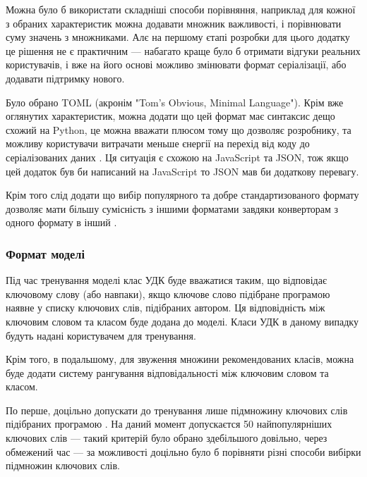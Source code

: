 \documentclass[14pt]{extarticle}
\begin{document}
  Можна було б використати складніші способи порівняння,
  наприклад для кожної з обраних характеристик можна додавати множник
  важливості, і порівнювати суму значень з множниками.
  Алє на першому єтапі розробки для цього додатку це рішення не є практичним ---
  набагато краще було б отримати відгуки реальних користувачів,
  і вже на його основі можливо змінювати формат серіалізації,
  або додавати підтримку нового.

  Було обрано TOML (акронім "Tom's Obvious, Minimal Language").
  Крім вже оглянутих характеристик,
  можна додати що цей формат має синтаксис дещо схожий на Python,
  це можна вважати плюсом тому що дозволяє розробнику,
  та можливу користувачи витрачати меньше єнергії
  на перехід від коду до серіалізованих даних \cite{Code_complete_5_2}.
  Ця ситуація є схожою на JavaScript та JSON,
  тож якщо цей додаток був би написаний на JavaScript
  то JSON мав би додаткову перевагу.

  Крім того слід додати що вибір популярного
  та добре стандартизованого формату дозволяє мати більшу сумісність
  з іншими форматами завдяки конверторам з одного формату в інший
  \cite{github_json2toml,github_xmltodict,github_x2js}.
  
  \subsubsection{Формат моделі}

  Під час тренування моделі клас УДК буде вважатися таким,
  що відповідає ключовому слову (або навпаки),
  якщо ключове слово підібране програмою наявне у списку ключових слів,
  підібраних автором.
  Ця відповідність між ключовим словом та класом буде додана до моделі.
  Класи УДК в даному випадку будуть надані користувачем для тренування.

  Крім того, в подальшому, для звуження множини рекомендованих класів,
  можна буде додати систему рангування відповідальності між ключовим словом
  та класом.

  По перше, доцільно допускати до тренування лише підмножину ключових слів
  підібраних програмою \cite{wiki_sampling}.
  На даний момент допускаєтся 50 найпопулярніших ключових слів ---
  такий критерій було обрано здебільшого довільно, через обмежений час ---
  за можливості доцільно було б порівняти різні способи вибірки
  \cite{wiki_sampling_methods}
  підмножин ключових слів.
\end{document}
